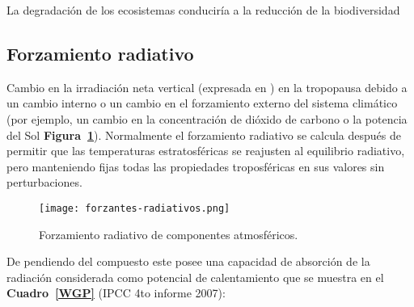 La degradación de los ecosistemas conduciría a la reducción de la biodiversidad

\subsection{Forzamiento radiativo}
Cambio en la irradiación neta vertical (expresada en \wattpersquaremetrenp) en la tropopausa debido a un cambio interno o un cambio en el forzamiento externo del sistema climático (por ejemplo, un cambio en la concentración de dióxido de carbono o la potencia del Sol \textbf{Figura~\ref{CGWP}}). Normalmente el forzamiento radiativo se calcula después de permitir que las temperaturas estratosféricas se reajusten al equilibrio radiativo, pero manteniendo fijas todas las propiedades troposféricas en sus valores sin perturbaciones.

\begin{figure}[!htbp]
\begin{center}
\texttt{[image: forzantes-radiativos.png]}
\caption{Forzamiento radiativo de componentes atmosféricos.}
\label{CGWP}
\end{center}
\end{figure}

De pendiendo del compuesto este posee una capacidad de absorción de la radiación considerada como potencial de calentamiento que se muestra en el \textbf{Cuadro~\ref{WGP}} (IPCC 4to informe 2007):

